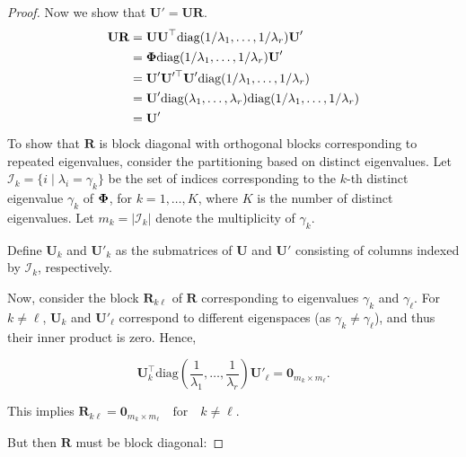 \begin{proof}
Now we show that $\textbf{U}' = \textbf{U}\textbf{R}$. 
\begin{align*}
    \textbf{U}\textbf{R} &= \textbf{U}\textbf{U}^\top \text{diag}(1/\lambda_1,\ldots,1/\lambda_r)\textbf{U}' \\
    &= \boldsymbol{\Phi} \text{diag}(1/\lambda_1,\ldots,1/\lambda_r)\textbf{U}' \\
    &= \textbf{U}'\textbf{U}'^\top\textbf{U}' \text{diag}(1/\lambda_1,\ldots,1/\lambda_r) \\
    &= \textbf{U}'\text{diag}(\lambda_1,\ldots,\lambda_r) \text{diag}(1/\lambda_1,\ldots,1/\lambda_r) \\
    &= \textbf{U}'
\end{align*}
 To show that \( \mathbf{R} \) is block diagonal with orthogonal blocks corresponding to repeated eigenvalues, consider the partitioning based on distinct eigenvalues. Let \( \mathcal{I}_k = \{i \mid \lambda_i = \gamma_k\} \) be the set of indices corresponding to the \( k \)-th distinct eigenvalue \( \gamma_k \) of \( \boldsymbol{\Phi} \), for \( k = 1, \ldots, K \), where \( K \) is the number of distinct eigenvalues. Let \( m_k = |\mathcal{I}_k| \) denote the multiplicity of \( \gamma_k \).
    
    Define \( \mathbf{U}_k \) and \( \mathbf{U}'_k \) as the submatrices of \( \mathbf{U} \) and \( \mathbf{U}' \) consisting of columns indexed by \( \mathcal{I}_k \), respectively.
    
    Now, consider the block \( \mathbf{R}_{k\ell} \) of \( \mathbf{R} \) corresponding to eigenvalues \( \gamma_k \) and \( \gamma_\ell \). For \( k \neq \ell \),
     \( \mathbf{U}_k \) and \( \mathbf{U}'_\ell \) correspond to different eigenspaces (as \( \gamma_k \neq \gamma_\ell \)), and thus their inner product is zero. Hence,
    
    \[
        \mathbf{U}_k^\top \text{diag}\left(\frac{1}{\lambda_1}, \ldots, \frac{1}{\lambda_r}\right) \mathbf{U}'_\ell = \mathbf{0}_{m_k \times m_\ell}.
    \]
    
    This implies $\mathbf{R}_{k\ell} = \mathbf{0}_{m_k \times m_\ell} \quad \text{for} \quad k \neq \ell.$
    
    But then \( \mathbf{R} \) must be block diagonal:
    

\end{proof}
